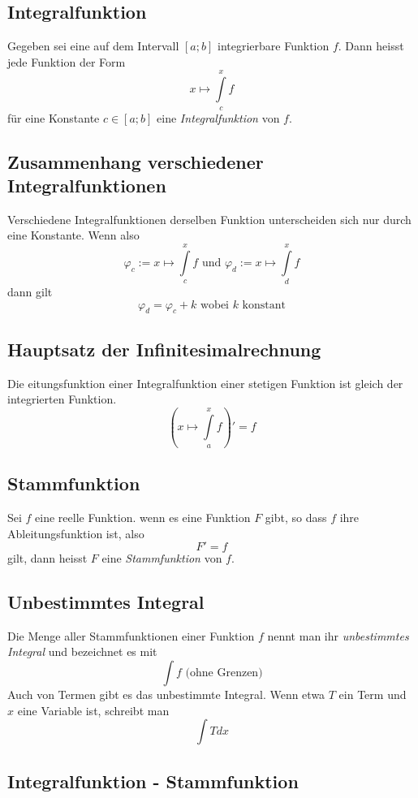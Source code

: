 \documentclass[10pt,a4paper]{scrartcl}
\begin{document}
\subsection{Integralfunktion}

Gegeben sei eine auf dem Intervall $[a;b]$ integrierbare Funktion $f$. Dann
heisst jede Funktion der Form
$$x \mapsto \int\limits_c^x f$$
für eine Konstante $c \in [a;b]$ eine \emph{Integralfunktion} von $f$.


\subsection{Zusammenhang verschiedener Integralfunktionen}

Verschiedene Integralfunktionen derselben Funktion unterscheiden sich nur durch
eine Konstante. Wenn also
$$\varphi_c := x \mapsto \int\limits_c^x f \textrm{ und } \varphi_d := x
    \mapsto \int\limits_d^x f$$
dann gilt
$$\varphi_d = \varphi_c + k \textrm{ wobei } k \textrm{ konstant}$$


\subsection{Hauptsatz der Infinitesimalrechnung}

Die eitungsfunktion einer Integralfunktion einer stetigen Funktion ist gleich
der integrierten Funktion.
$$\left(x \mapsto \int\limits_a^x f\right)' = f$$


\subsection{Stammfunktion}

Sei $f$ eine reelle Funktion. wenn es eine Funktion $F$ gibt, so dass $f$ ihre
Ableitungsfunktion ist, also
$$F' = f$$
gilt, dann heisst $F$ eine \emph{Stammfunktion} von $f$.


\subsection{Unbestimmtes Integral}

Die Menge aller Stammfunktionen einer Funktion $f$ nennt man ihr
\emph{unbestimmtes Integral} und bezeichnet es mit
$$\int f \textrm{ (ohne Grenzen)}$$
Auch von Termen gibt es das unbestimmte Integral. Wenn etwa $T$ ein Term und
$x$ eine Variable ist, schreibt man
$$\int Tdx$$


\subsection{Integralfunktion - Stammfunktion}
\end{document}
